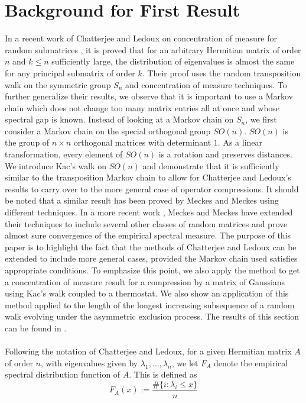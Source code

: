 \documentclass[12pt]{report}
\theoremstyle{definition}
\begin{document}
\section{Background for First Result}
In a recent work of Chatterjee and Ledoux on concentration of measure for random submatrices \cite{ChatLed}, it is proved that for an arbitrary Hermitian matrix of order $n$ and $k\leq n$ sufficiently large, the distribution of eigenvalues is almost the same for any principal submatrix of order $k$.  Their proof uses the random transposition walk on the symmetric group $S_n$ and concentration of measure techniques.  To further generalize their results, we observe that it is important to use a Markov chain which does not change too many matrix entries all at once and whose spectral gap is known. Instead of looking at a Markov chain on $S_n$, we first consider a Markov chain on the special orthogonal group $SO(n)$.  $SO(n)$ is the group of $n\times n$ orthogonal matrices with determinant $1$.  As a linear transformation, every element of $SO(n)$ is a rotation and preserves distances.   We introduce Kac's walk on $SO(n)$ and demonstrate that it is sufficiently similar to the transposition Markov chain to allow for Chatterjee and Ledoux's results to carry over to the more general case of operator compressions.  It should be noted that a similar result has been proved by Meckes and Meckes \cite {MeckesMeckes} using different techniques.  In a more recent work \cite{MeckesMeckes2}, Meckes and Meckes have extended their techniques to include several other classes of random matrices and prove almost sure convergence of the empirical spectral measure.   The purpose of this paper is to highlight the fact that the methods of Chatterjee and Ledoux can be extended to include more general cases, provided the Markov chain used satisfies appropriate conditions.  To emphasize this point, we also apply the method to get a concentration of measure result for a compression by a matrix of Gaussians using Kac's walk coupled to a thermostat. We also show an application of this method applied to the length of the longest increasing subsequence of a random walk evolving under the asymmetric exclusion process.  The results of this section can be found in \cite{SNandMW}.\\ \\ Following the notation of Chatterjee and Ledoux, for a given Hermitian matrix $A$ of order $n$, with eigenvalues given by $\lambda_1,\dots,\lambda_n$, we let $F_A$ denote the empirical spectral distribution function of $A$.  This is defined as
$$
F_A(x):=\frac{\#\{i:\lambda_i\leq x\}}{n}
$$
\end{document}
